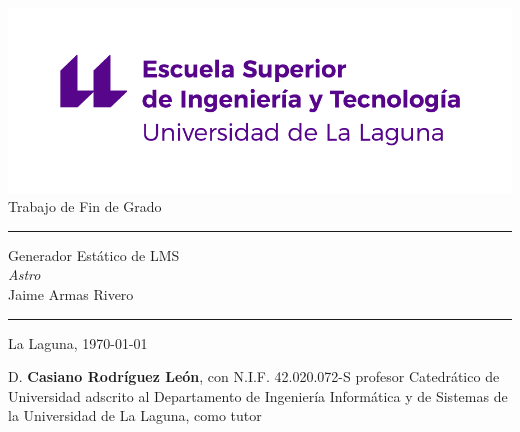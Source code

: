 \documentclass[spanish,a4paper,12pt,oneside]{extreport}
\begin{document}
\renewcommand\listtablename{Índice de Tablas}    
\renewcommand\listfigurename{Índice de Figuras}    

\pagestyle{empty}
\thispagestyle{empty}


\newcommand{\HRule}{\rule{\linewidth}{1mm}}
\setlength{\parindent}{0mm}
\setlength{\parskip}{0mm}


\begin{center}
\includegraphics[scale=0.8]{images/escuela-ingenieria-tecnologia-original}\\[10mm]
{\Huge Trabajo de Fin de Grado}
\end{center}

\HRule
\begin{flushright}
        {\Huge Generador Estático de LMS} \\[2.5mm]
        {\Large \textit{Astro}} \\[5mm]
        {\Large Jaime Armas Rivero} \\[5mm]

\end{flushright}
\HRule
{}
\begin{center}
  \Large La Laguna, \today
\end{center}

\setlength{\parindent}{5mm}

\newpage
\thispagestyle{empty}

D. {\bf Casiano Rodríguez León}, con N.I.F. 42.020.072-S  profesor Catedrático de Universidad adscrito al Departamento de Ingeniería Informática y de Sistemas de la Universidad de La Laguna, como tutor
\end{document}
